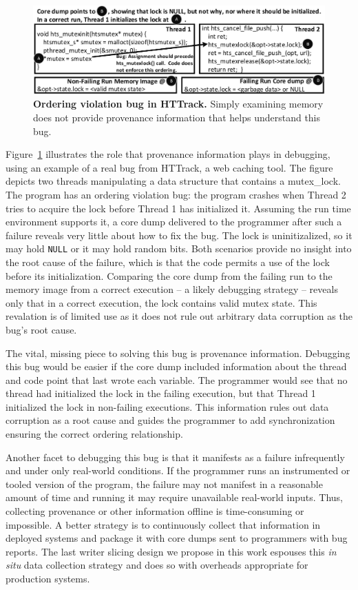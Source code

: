\documentclass[preprint,9pt]{sigplanconf}
\begin{document}
\begin{figure}[h]
\centering
\includegraphics[width=\columnwidth]{figs/BackgroundCoreDumpFail.pdf}
\caption{\label{fig:coreDumpFail}{\bf Ordering violation bug in HTTrack.} Simply examining memory does not provide provenance information that helps understand this bug.}
\end{figure}

Figure~\ref{fig:coreDumpFail} illustrates the role that provenance information
plays in debugging, using an example of a real bug from HTTrack, a web caching
tool.  The figure depicts two threads manipulating a data structure that
contains a mutex\_lock.  The program has an ordering violation bug: the program
crashes when Thread 2 tries to acquire the lock before Thread 1 has initialized
it.  Assuming the run time environment supports it, a core dump delivered to
the programmer after such a failure reveals very little about how to fix the
bug.  The lock is uninitizalized, so it may hold {\tt NULL} or it may hold
random bits.  Both scenarios provide no insight into the root cause of the
failure, which is that the code permits a use of the lock before its
initialization.   Comparing the core dump from the failing run to the memory
image from a correct execution -- a likely debugging strategy -- reveals only
that in a correct execution, the lock contains valid mutex state.  This
revalation is of limited use as it does not rule out arbitrary data corruption
as the bug's root cause.

The vital, missing piece to solving this bug is provenance information.
Debugging this bug would be easier if the core dump included information about
the thread and code point that last wrote each variable.  The programmer would
see that no thread had initialized the lock in the failing execution, but that
Thread 1 initialized the lock in non-failing executions.  This information
rules out data corruption as a root cause and guides the programmer to add
synchronization ensuring the correct ordering relationship.

Another facet to debugging this bug is that it manifests as a failure
infrequently and under only real-world conditions.  If the programmer runs an
instrumented or tooled version of the program, the failure may not manifest in
a reasonable amount of time and running it may require unavailable real-world
inputs.  Thus, collecting provenance or other information offline is
time-consuming or impossible.  A better strategy is to continuously collect
that information in deployed systems and package it with core dumps sent to
programmers with bug reports.  The last writer slicing design we propose in
this work espouses this {\em in situ} data collection strategy and does so with
overheads appropriate for production systems.
 
\end{document}
